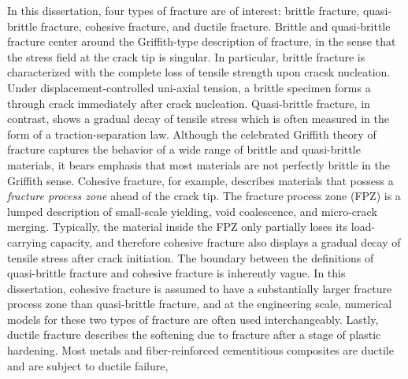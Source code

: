 In this dissertation, four types of fracture are of interest: brittle fracture, quasi-brittle fracture, cohesive fracture, and ductile fracture. Brittle and quasi-brittle fracture center around the Griffith-type description of fracture, in the sense that the stress field at the crack tip is singular. In particular, brittle fracture is characterized with the complete loss of tensile strength upon cracsk nucleation. Under displacement-controlled uni-axial tension, a brittle specimen forms a through crack immediately after crack nucleation. Quasi-brittle fracture, in contrast, shows a gradual decay of tensile stress which is often measured in the form of a traction-separation law. Although the celebrated Griffith theory of fracture captures the behavior of a wide range of brittle and quasi-brittle materials, it bears emphasis that most materials are not perfectly brittle in the Griffith sense. Cohesive fracture, for example, describes materials that possess a \emph{fracture process zone} ahead of the crack tip. The fracture process zone (FPZ) is a lumped description of small-scale yielding, void coalescence, and micro-crack merging. Typically, the material inside the FPZ only partially loses its load-carrying capacity, and therefore cohesive fracture also displays a gradual decay of tensile stress after crack initiation. The boundary between the definitions of quasi-brittle fracture and cohesive fracture is inherently vague. In this dissertation, cohesive fracture is assumed to have a substantially larger fracture process zone than quasi-brittle fracture, and at the engineering scale, numerical models for these two types of fracture are often used interchangeably. Lastly, ductile fracture describes the softening due to fracture after a stage of plastic hardening. Most metals and fiber-reinforced cementitious composites are ductile and are subject to ductile failure,

